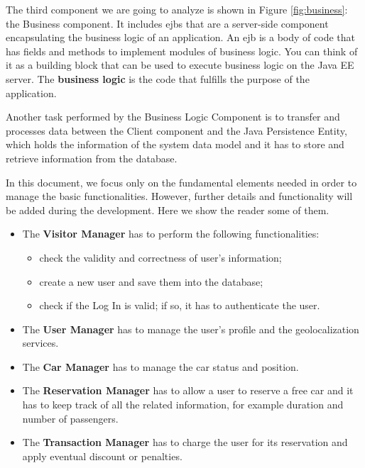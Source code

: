 \newline
The third component we are going to analyze is shown in Figure \ref{fig:business}: the Business component. It includes \acl{ejb}s that are a server-side component encapsulating the business logic of an application. An \acs{ejb} is a body of code that has fields and methods to implement modules of business logic. You can think of it as a building block that can be used to execute business logic on the Java EE server.
The \textbf{business logic} is the code that fulfills the purpose of the application.

Another task performed by the Business Logic Component is to transfer and processes data between the Client component and the Java Persistence Entity, which holds the information of the system data model and it has to store and retrieve information from the database.

In this document, we focus only on the fundamental elements needed in order to manage the basic functionalities. However, further details and functionality will be added during the development. Here we show the reader some of them.

\begin{itemize}
\item The \textbf{Visitor Manager} has to perform the following functionalities:
	\begin{itemize}
	\item check the validity and correctness of user's information;
	\item create a new user and save them into the database;
	\item check if the Log In is valid; if so, it has to authenticate the user.
	\end{itemize}
\item The \textbf{User Manager} has to manage the user's profile and the geolocalization services.
\item The \textbf{Car Manager} has to manage the car status and position.
\item The \textbf{Reservation Manager} has to allow a user to reserve a free car and it has to keep track of all the related information, for example duration and number of passengers.
\item The \textbf{Transaction Manager} has to charge the user for its reservation and apply eventual discount or penalties.
\end{itemize}
\clearpage

